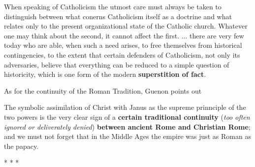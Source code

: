 \begin{quotex}
When speaking of Catholicism the utmost care must always be taken to distinguish between what conerns Catholicism itself as a doctrine and what relates only to the present organizational state of the Catholic church. Whatever one may think about the second, it cannot affect the first. ... there are very few today who are able, when such a need arises, to free themselves from historical contingencies, to the extent that certain defenders of Catholicism, not only its adversaries, believe that everything can be reduced to a simple question of historicity, which is one form of the modern \textbf{superstition of fact}.
\end{quotex}


As for the continuity of the Roman Tradition, Guenon points out

\begin{quotex}
The symbolic assimilation of Christ with Janus as the supreme prinnciple of the two powers is the very clear sign of a \textbf{certain traditional continuity} (\emph{too often ignored or deliverately denied}) \textbf{between ancient Rome and Christian Rome}; and we must not forget that in the Middle Ages the empire was just as Roman as the papacy.
\end{quotex}



\begin{center}* * *\end{center}

